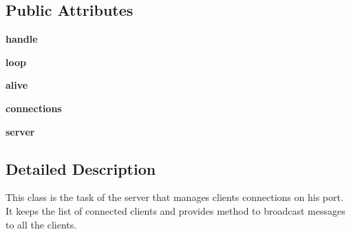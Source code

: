 \subsection*{\-Public \-Attributes}
\begin{DoxyCompactItemize}
\item 
\hypertarget{classsrc_1_1network_1_1_network_server_a69b93e1961b39b8f938935cc180777be}{{\bfseries handle}}\label{classsrc_1_1network_1_1_network_server_a69b93e1961b39b8f938935cc180777be}

\item 
\hypertarget{classsrc_1_1network_1_1_network_server_acdbc2949d7656674a34b360a805e6bed}{{\bfseries loop}}\label{classsrc_1_1network_1_1_network_server_acdbc2949d7656674a34b360a805e6bed}

\item 
\hypertarget{classsrc_1_1network_1_1_network_server_ab384a6e8eca2b22a0d3aef7bb3a8f843}{{\bfseries alive}}\label{classsrc_1_1network_1_1_network_server_ab384a6e8eca2b22a0d3aef7bb3a8f843}

\item 
\hypertarget{classsrc_1_1network_1_1_network_server_a35bebc0410020a859cef9c55174340e6}{{\bfseries connections}}\label{classsrc_1_1network_1_1_network_server_a35bebc0410020a859cef9c55174340e6}

\item 
\hypertarget{classsrc_1_1network_1_1_network_server_a37a504d8194443b4a466ea63d1e9278d}{{\bfseries server}}\label{classsrc_1_1network_1_1_network_server_a37a504d8194443b4a466ea63d1e9278d}

\end{DoxyCompactItemize}


\subsection{\-Detailed \-Description}
\begin{DoxyVerb}
This class is the task of the server that manages clients connections on
his port.  It keeps the list of connected clients and provides method to
broadcast messages to all the clients.
\end{DoxyVerb}
 

